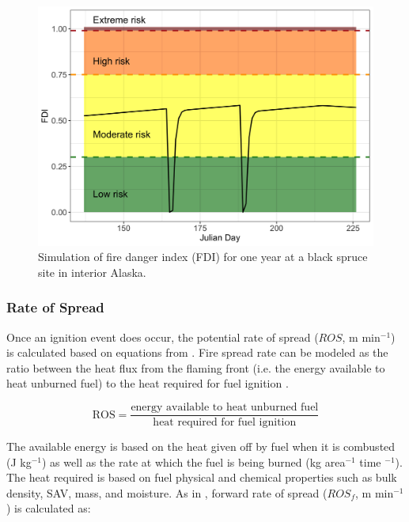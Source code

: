 \documentclass[a4paper, 12pt] {report}
\begin{document}
\begin{figure}
	\includegraphics[width=\linewidth]{figures/FDI.png}
	\caption{Simulation of fire danger index (FDI) for one year at a black spruce site in interior Alaska.}
	\label{fig:FDIfig}
\end{figure}

\subsubsection{Rate of Spread}

Once an ignition event does occur, the potential rate of spread ($ROS$, m min$^{-1}$) is calculated based on equations from . Fire spread rate can be modeled as the ratio between the heat flux from the flaming front (i.e. the energy available to heat unburned fuel) to the heat required for fuel ignition \cite{johnsonFireVegetationDynamics1992}.

\begin{equation*} 
	\text{ROS} = \frac{\text{energy available to heat unburned fuel}}{\text{heat required for fuel ignition}}
\end{equation*}

The available energy is based on the heat given off by fuel when it is combusted (J kg$^{-1}$) as well as the rate at which the fuel is being burned (kg area$^{-1}$ time $^{-1}$). The heat required is based on fuel physical and chemical properties such as bulk density, SAV, mass, and moisture. As in , forward rate of spread ($ROS_f$, m min$^{-1}$) is calculated as:
\end{document}
